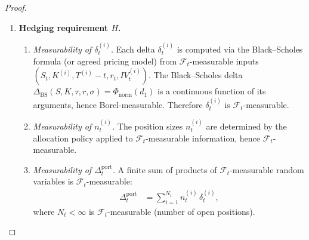 \documentclass[12pt,openany]{book}
\newcommand{\calF}{\mathcal{F}}
\numberwithin{equation}{chapter}
\theoremstyle{plain}
\theoremstyle{definition}
\theoremstyle{remark}
\numberwithin{equation}{chapter}
\theoremstyle{plain}
\begin{document}
\begin{proof}
\begin{enumerate}
\begin{enumerate}
      \item \emph{Domain of $R_{\mathrm{port}}$.}
        The normalisation $\Phi : \mathbb{R} \to [0,1]$ is
        bounded by construction (e.g.\ $\Phi(x) = \sigma(x)$ the
        logistic function, or a min-max map).
        Hence $\rho_t = \tfrac{1}{2}(\Phi(\mathrm{VaR}) +
        \Phi(\mathrm{CVaR})) \in [0,1]$.
        The clamp $\min(1, \max(0, \rho_t)) = \rho_t$ since
        $\rho_t \in [0,1]$ already.
        Therefore $R_{\mathrm{port}} \in [0,1]$.

      \item \emph{Measurability of $R_{\mathrm{port}}$.}
        $\Phi$ is a fixed Borel-measurable function.
        The composition of $\calF_t$-measurable inputs
        ($\mathrm{VaR}_\alpha(t)$, $\mathrm{CVaR}_\alpha(t)$)
        with Borel-measurable operations
        ($\Phi$, arithmetic mean, clamp) is
        $\calF_t$-measurable by the measurability of composed
        functions.
    \end{enumerate}

  \item \textbf{Hedging requirement $H$.}

    \begin{enumerate}
      \item \emph{Measurability of $\delta_t^{(i)}$.}
        Each delta $\delta_t^{(i)}$ is computed via the
        Black--Scholes formula (or agreed pricing model) from
        $\calF_t$-measurable inputs
        $(S_t, K^{(i)}, T^{(i)}-t, r_t, IV_t^{(i)})$.
        The Black--Scholes delta
        $\Delta_{\mathrm{BS}}(S,K,\tau,r,\sigma)
          = \Phi_{\mathrm{norm}}(d_1)$
        is a continuous function of its arguments, hence
        Borel-measurable.
        Therefore $\delta_t^{(i)}$ is $\calF_t$-measurable.

      \item \emph{Measurability of $n_t^{(i)}$.}
        The position sizes $n_t^{(i)}$ are determined by the
        allocation policy applied to $\calF_t$-measurable
        information, hence $\calF_t$-measurable.

      \item \emph{Measurability of $\Delta_t^{\mathrm{port}}$.}
        A finite sum of products of $\calF_t$-measurable random
        variables is $\calF_t$-measurable:
        \begin{align}
          \Delta_t^{\mathrm{port}}
            &= \sum_{i=1}^{N_t} n_t^{(i)}\, \delta_t^{(i)},
        \end{align}
        where $N_t < \infty$ is $\calF_t$-measurable (number of
        open positions).


\end{enumerate}
\end{enumerate}
\end{proof}
\end{document}
